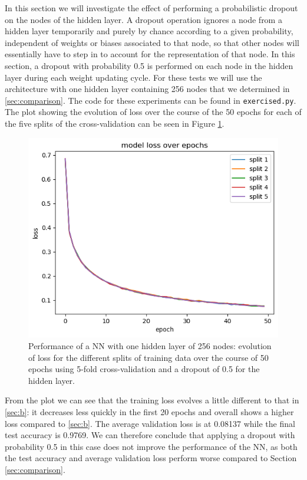 \documentclass[12pt]{article}
\newcommand{\exercised}{\texttt{exercised.py}\;}
\begin{document}
In this section we will investigate the effect of performing a probabilistic dropout on the nodes of the hidden layer. A dropout operation ignores a node from a hidden layer temporarily and purely by chance according to a given probability, independent of weights or biases associated to that node, so that other nodes will essentially have to step in to account for the representation of that node. In this section, a dropout with probability 0.5 is performed on each node in the hidden layer during each weight updating cycle. For these tests we will use the architecture with one hidden layer containing 256 nodes that we determined in \ref{sec:comparison}. The code for these experiments can be found in \exercised. The plot showing the evolution of loss over the course of the 50 epochs for each of the five splits of the cross-validation can be seen in Figure \ref{fig:exercised}. 

\begin{figure}[ht]
    \centering
   \includegraphics[scale=0.6]{graphics/loss_over_epochs_exercise_d.png}
    \caption{Performance of a NN with one hidden layer of 256 nodes: evolution of loss for the different splits of training data over the course of 50 epochs using 5-fold cross-validation and a dropout of 0.5 for the hidden layer.}
    \label{fig:exercised}
\end{figure}

From the plot we can see that the training loss evolves a little different to that in \ref{sec:b}: it decreases less quickly in the first 20 epochs and overall shows a higher loss compared to \ref{sec:b}. The average validation loss is at 0.08137 while the final test accuracy is 0.9769. We can therefore conclude that applying a dropout with probability 0.5 in this case does not improve the performance of the NN, as both the test accuracy and average validation loss perform worse compared to Section \ref{sec:comparison}.  
\end{document}
